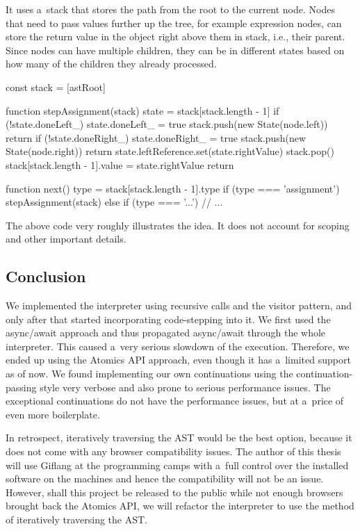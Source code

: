 It uses a~stack that stores the path from the root to the current node. Nodes that need to pass values further up the tree, for example expression nodes, can store
the return value in the object right above them in stack, i.e., their parent. Since nodes can have multiple children, they can be in different states
based on how many of the children they already processed.

\begin{code}
const stack = [astRoot]

function stepAssignment(stack) {
    state = stack[stack.length - 1]
    if (!state.doneLeft_) {
        state.doneLeft_ = true
        stack.push(new State(node.left))
        return
    }
    if (!state.doneRight_) {
        state.doneRight_ = true
        stack.push(new State(node.right))
        return
    }
    state.leftReference.set(state.rightValue)
    stack.pop()
    stack[stack.length - 1].value = state.rightValue
    return
}

function next() {
    type = stack[stack.length - 1].type
    if (type === 'assignment') {
        stepAssignment(stack)
    } else if (type === '...') {
        // ...
    }
}
\end{code}

The above code very roughly illustrates the idea. It does not account for scoping and other important details.

\subsection*{Conclusion}
We implemented the interpreter using recursive calls and the visitor pattern, and only after that started incorporating code-stepping into it. We first used
the async/await approach and thus propagated async/await through the whole interpreter. This caused a~very serious slowdown of the execution. Therefore, we ended
up using the Atomics API approach, even though it has a~limited support as of now. We found implementing our own continuations using the continuation-passing style
very verbose and also prone to serious performance issues. The exceptional continuations do not have the performance issues, but at a~price of even more boilerplate.

In retrospect, iteratively traversing the AST would be the best option, because it does not come with any browser compatibility issues. The author of this thesis
will use Giflang at the programming camps with a~full control over the installed software on the machines and hence the compatibility will not be an issue.
However, shall this project be released to the public while not enough browsers brought back the Atomics API, we will refactor the interpreter to
use the method of iteratively traversing the AST.

